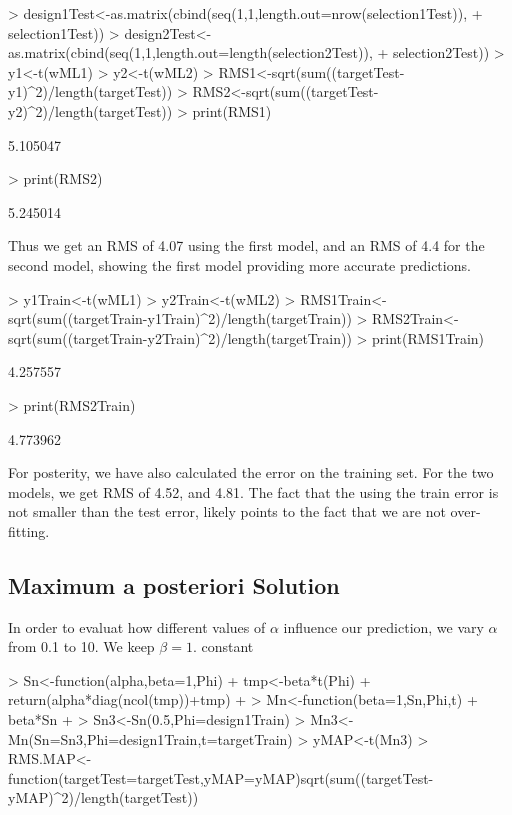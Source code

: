 \documentclass[nogin, 10pt]{article}
\begin{document}
\begin{Schunk}
\begin{Sinput}
> design1Test<-as.matrix(cbind(seq(1,1,length.out=nrow(selection1Test)),
+                          selection1Test))
> design2Test<-as.matrix(cbind(seq(1,1,length.out=length(selection2Test)),
+                          selection2Test))
> y1<-t(wML1)%
> y2<-t(wML2)%
> RMS1<-sqrt(sum((targetTest-y1)^2)/length(targetTest))
> RMS2<-sqrt(sum((targetTest-y2)^2)/length(targetTest))
> print(RMS1)
\end{Sinput}
\begin{Soutput}
[1] 5.105047
\end{Soutput}
\begin{Sinput}
> print(RMS2)
\end{Sinput}
\begin{Soutput}
[1] 5.245014
\end{Soutput}
\end{Schunk}
Thus we get an RMS of 4.07 using the first model, and an RMS of 4.4 for the second model, showing the first model providing more accurate predictions. 

\begin{Schunk}
\begin{Sinput}
> y1Train<-t(wML1)%
> y2Train<-t(wML2)%
> RMS1Train<-sqrt(sum((targetTrain-y1Train)^2)/length(targetTrain))
> RMS2Train<-sqrt(sum((targetTrain-y2Train)^2)/length(targetTrain))
> print(RMS1Train)
\end{Sinput}
\begin{Soutput}
[1] 4.257557
\end{Soutput}
\begin{Sinput}
> print(RMS2Train)
\end{Sinput}
\begin{Soutput}
[1] 4.773962
\end{Soutput}
\end{Schunk}
For posterity, we have also calculated the error on the training set. For the two models, we get RMS of 4.52, and 4.81. The fact that the using the train error is not smaller than the test error, likely points to the fact that we are not over-fitting.

\subsection{Maximum a posteriori Solution}
In order to evaluat how different values of $\alpha$ influence our prediction, we vary $\alpha$ from 0.1 to 10. We keep $\beta=1$. constant
\begin{Schunk}
\begin{Sinput}
> Sn<-function(alpha,beta=1,Phi){
+   tmp<-beta*t(Phi)%
+   return(alpha*diag(ncol(tmp))+tmp) 
+ }
> Mn<-function(beta=1,Sn,Phi,t){
+   beta*Sn%
+ }
> Sn3<-Sn(0.5,Phi=design1Train)
> Mn3<-Mn(Sn=Sn3,Phi=design1Train,t=targetTrain)
> yMAP<-t(Mn3)%
> RMS.MAP<-function(targetTest=targetTest,yMAP=yMAP){sqrt(sum((targetTest-yMAP)^2)/length(targetTest))}
\end{Sinput}
\end{Schunk}
\end{document}
